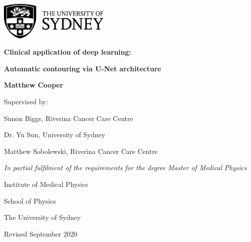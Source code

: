 \documentclass[a4paper,oneside, 12pt,parskip=half]{scrbook}
\begin{document}
\begin{titlepage}

\begin{center}
	\includegraphics[width=0.4\textwidth]{figures/usyd_logo}
\end{center}
	\vspace{2cm}
\begin{center}
	\LARGE\textbf{Clinical application of deep learning:}

	\LARGE\textbf{Automatic contouring via U-Net architecture}

	\vfill

	\normalsize
  \large{\textbf{Matthew Cooper}}

  \vfill
	
	\normalsize
	Supervised by:

	Simon Biggs, Riverina Cancer Care Centre
  
	Dr. Yu Sun, University of Sydney
  
	Matthew Sobolewski, Riverina Cancer Care Centre 
	
	\vspace{1cm}
	
	\textit{In partial fulfilment of the requirements for the degree Master of Medical Physics}
	
	\vspace{1cm}
	
	Institute of Medical Physics
	
	School of Physics
	
	The University of Sydney
	
  \vspace{3cm}
  Revised September 2020

	\vfill
  \end{center}

\end{titlepage}


\frontmatter
\tableofcontents



\listoffigures
\listoftables


\mainmatter







\backmatter
\small{\printbibliography[title=References]}
\end{document}
